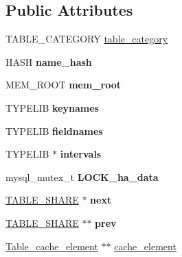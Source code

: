 \subsection*{Public Attributes}
\begin{DoxyCompactItemize}
\item 
T\+A\+B\+L\+E\+\_\+\+C\+A\+T\+E\+G\+O\+RY \mbox{\hyperlink{structTABLE__SHARE_aaf3e5f8c4f8f32d7e7b3451800e03243}{table\+\_\+category}}
\item 
\mbox{\label{structTABLE__SHARE_a05598e1a3c67f5a1264b53b19447fe64}} 
H\+A\+SH {\bfseries name\+\_\+hash}
\item 
\mbox{\label{structTABLE__SHARE_a0c48fc8b8cf0916d4ef839f4c4bc62df}} 
M\+E\+M\+\_\+\+R\+O\+OT {\bfseries mem\+\_\+root}
\item 
\mbox{\label{structTABLE__SHARE_a3ba1c703b3ae9c458d7794b2ca1fa1a9}} 
T\+Y\+P\+E\+L\+IB {\bfseries keynames}
\item 
\mbox{\label{structTABLE__SHARE_a791c2e0578d0065faf65694d47fcd0f0}} 
T\+Y\+P\+E\+L\+IB {\bfseries fieldnames}
\item 
\mbox{\label{structTABLE__SHARE_adb2550b7ed3fef5452a08ed447d410aa}} 
T\+Y\+P\+E\+L\+IB $\ast$ {\bfseries intervals}
\item 
\mbox{\label{structTABLE__SHARE_aa8049afbfa5ce54ee4101c98704b4933}} 
mysql\+\_\+mutex\+\_\+t {\bfseries L\+O\+C\+K\+\_\+ha\+\_\+data}
\item 
\mbox{\label{structTABLE__SHARE_a95dbf649aea92b7488a9216a78404883}} 
\mbox{\hyperlink{structTABLE__SHARE}{T\+A\+B\+L\+E\+\_\+\+S\+H\+A\+RE}} $\ast$ {\bfseries next}
\item 
\mbox{\label{structTABLE__SHARE_addcfee0201d0799d45d79ecf78a101ba}} 
\mbox{\hyperlink{structTABLE__SHARE}{T\+A\+B\+L\+E\+\_\+\+S\+H\+A\+RE}} $\ast$$\ast$ {\bfseries prev}
\item 
\mbox{\hyperlink{classTable__cache__element}{Table\+\_\+cache\+\_\+element}} $\ast$$\ast$ \mbox{\hyperlink{structTABLE__SHARE_a0b2d66b9a33c0007107a15690955b44f}{cache\+\_\+element}}

\end{DoxyCompactItemize}
